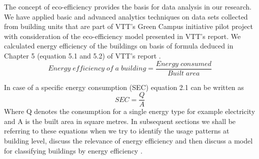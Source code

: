 The concept of eco-efficiency provides the basis for data analysis in our research. We have applied basic and advanced analytics techniques on data sets collected from building units that are part of VTT's Green Campus initiative pilot project with consideration of the eco-efficiency model presented in VTT's report. We calculated energy efficiency of  the buildings on basis of formula deduced in Chapter 5 (equation 5.1 and 5.2) of VTT's  report \cite{forsstrommeasuring}.
\begin{equation}
Energy\;efficiency\;of\;a\;building  =  \frac{Energy\;consumed}{Built\;area}
\end{equation}  

In case of a specific energy consumption (SEC) \cite{forsstrommeasuring} equation 2.1 can be written as 
\begin{equation} \label{spec_energy}
SEC  = \frac{Q}{A}
\end{equation} 
Where Q denotes the consumption for a single energy type for example electricity and A is the built area in square metres. In subsequent sections we shall be  referring to these equations when we try to identify the usage patterns at building level, discuss the relevance of  energy efficiency and then discuss a model for classifying buildings by energy efficiency .

